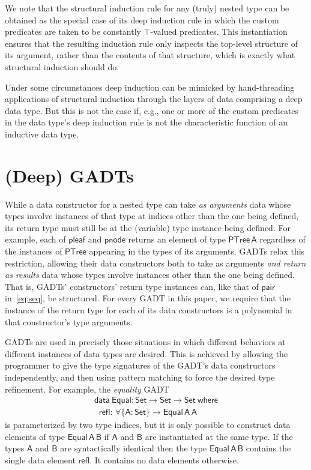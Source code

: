 \documentclass[sigplan,10pt,anonymous,review]{acmart}
\begin{document}
We note that the structural induction rule for any (truly) nested type
can be obtained as the special case of its deep induction rule in
which the custom predicates are taken to be constantly
$\mathsf{\top}$-valued predicates. This instantiation ensures that
the resulting induction rule only inspects the top-level structure of
its argument, rather than the contents of that structure, which is
exactly what structural induction should do.

Under some circumstances deep induction can be mimicked by
hand-threading applications of structural induction through the layers
of data comprising a deep data type. But this is not the case if,
e.g., one or more of the custom predicates in the data type's deep
induction rule is not the characteristic function of an inductive data
type.

\section{(Deep) GADTs}\label{sec:GADTs}

While a data constructor for a nested type can take {\em as arguments}
data whose types involve instances of that type at indices other than
the one being defined, its return type must still be at the (variable)
type instance being defined. For example, each of $\mathsf{pleaf}$ and
$\mathsf{pnode}$ returns an element of type $\mathsf{PTree\,A}$
regardless of the instances of $\mathsf{PTree}$ appearing in the types
of its arguments. GADTs relax this restriction, allowing their data
constructors both to take as arguments \emph{and return as results}
data whose types involve instances other than the one being
defined. That is, GADTs' constructors' return type instances can, like
that of $\mathsf{pair}$ in~\eqref{eq:seq}, be structured.  For every
GADT in this paper, we require that the instance of the return type
for each of its data constructors is a polynomial in that
constructor's type arguments.

GADTs are used in precisely those situations in which different
behaviors at different instances of data types are desired. This is
achieved by allowing the programmer to give the type signatures of the
GADT's data constructors independently, and then using pattern
matching to force the desired type refinement. For example, the {\em
  equality} GADT
\begin{equation}\label{eq:equal}
\begin{array}{l}
\mathsf{data\ Equal : Set \to Set \to Set\ where}\\
\mathsf{\;\;refl :\, \forall \{A : Set\} \to Equal\,A\,A}
\end{array}
\end{equation}
is parameterized by two type indices, but it is only possible to
construct data elements of type $\mathsf{Equal\,A\,B}$ if $\mathsf{A}$
and $\mathsf{B}$ are instantiated at the same type. If the types
$\mathsf{A}$ and $\mathsf{B}$ are syntactically identical then the
type $\mathsf{Equal\,A\,B}$ contains the single data element
$\mathsf{refl}$. It contains no data elements otherwise.
\end{document}
